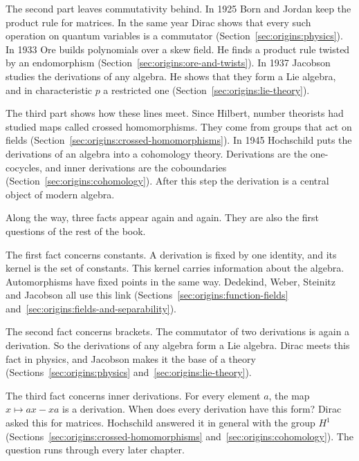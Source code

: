 The second part leaves commutativity behind. In 1925 Born and Jordan keep the
product rule for matrices. In the same year Dirac shows that every such
operation on quantum variables is a commutator
(Section~\ref{sec:origins:physics}). In 1933 Ore builds polynomials over a
skew field. He finds a product rule twisted by an endomorphism
(Section~\ref{sec:origins:ore-and-twists}). In 1937 Jacobson studies the
derivations of any algebra. He shows that they form a Lie algebra, and in
characteristic $p$ a restricted one (Section~\ref{sec:origins:lie-theory}).

The third part shows how these lines meet. Since Hilbert, number theorists had
studied maps called crossed homomorphisms. They come from groups that act on
fields (Section~\ref{sec:origins:crossed-homomorphisms}). In 1945 Hochschild
puts the derivations of an algebra into a cohomology theory. Derivations are
the one-cocycles, and inner derivations are the coboundaries
(Section~\ref{sec:origins:cohomology}). After this step the derivation is a
central object of modern algebra.

Along the way, three facts appear again and again. They are also the first
questions of the rest of the book.

The first fact concerns constants. A derivation is fixed by one identity, and
its kernel is the set of constants. This kernel carries information about the
algebra. Automorphisms have fixed points in the same way. Dedekind, Weber,
Steinitz and Jacobson all use this link
(Sections~\ref{sec:origins:function-fields}
and~\ref{sec:origins:fields-and-separability}).

The second fact concerns brackets. The commutator of two derivations is again
a derivation. So the derivations of any algebra form a Lie algebra. Dirac
meets this fact in physics, and Jacobson makes it the base of a theory
(Sections~\ref{sec:origins:physics} and~\ref{sec:origins:lie-theory}).

The third fact concerns inner derivations. For every element $a$, the map
$x \mapsto ax - xa$ is a derivation. When does every derivation have this
form? Dirac asked this for matrices. Hochschild answered it in general with
the group $H^1$ (Sections~\ref{sec:origins:crossed-homomorphisms}
and~\ref{sec:origins:cohomology}). The question runs through every later
chapter.
